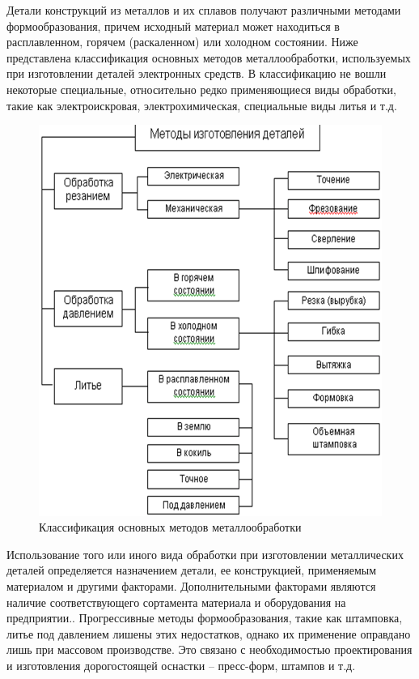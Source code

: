 \documentclass[unicode, 12pt, a4paper, oneside]{article}
\begin{document}
Детали конструкций из металлов и их сплавов получают различными методами формообразования, причем исходный материал может находиться в расплавленном, горячем (раскаленном) или холодном состоянии. Ниже представлена классификация основных методов металлообработки, используемых при изготовлении деталей электронных средств. В классификацию не вошли некоторые специальные, относительно редко применяющиеся виды обработки, такие как электроискровая, электрохимическая, специальные виды литья и т.д.

\begin{figure}[htbp]
\centering
\includegraphics[width=1.0\textwidth]{99_scheme.png}
\caption{Классификация основных методов металлообработки}
\label{fig:99_scheme}
\end{figure}

Использование того или иного вида обработки при изготовлении металлических деталей определяется назначением детали, ее конструкцией, применяемым материалом и другими факторами. Дополнительными факторами являются наличие соответствующего сортамента материала и оборудования на предприятии.. Прогрессивные методы формообразования, такие как штамповка, литье под давлением лишены этих недостатков, однако их применение оправдано лишь при массовом производстве. Это связано с необходимостью проектирования и изготовления дорогостоящей оснастки – пресс-форм, штампов и т.д.
\end{document}
